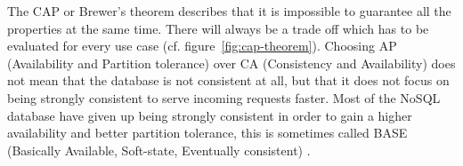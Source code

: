 The CAP or Brewer's theorem describes that it is impossible to guarantee all the properties at the same time. There will always be a trade off which has to be evaluated for every use case (cf. figure~\ref{fig:cap-theorem}). Choosing AP (Availability and Partition tolerance) over CA (Consistency and Availability) does not mean that the database is not consistent at all, but that it does not focus on being strongly consistent to serve incoming requests faster. Most of the NoSQL database have given up being strongly consistent in order to gain a higher availability and better partition tolerance, this is sometimes called BASE (Basically Available, Soft-state, Eventually consistent) \cite[4]{moniruzzaman.2013}.